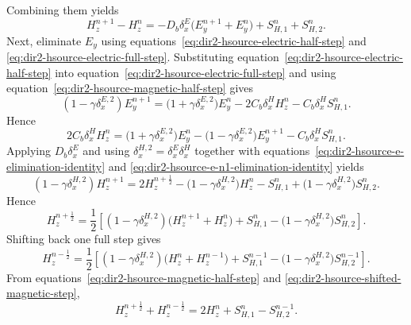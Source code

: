 \documentclass{article}
\numberwithin{figure}{section}
\begin{document}
Combining them yields
\begin{equation}
    H_z^{n+1}-H_z^n=-D_b\delta_x^E\bigl(E_y^{n+1}+E_y^n\bigr)+S_{H,1}^n+S_{H,2}^n. \label{eq:dir2-hsource-h-difference}
\end{equation}
Next, eliminate $E_y$ using equations~\eqref{eq:dir2-hsource-electric-half-step} and \eqref{eq:dir2-hsource-electric-full-step}. Substituting equation~\eqref{eq:dir2-hsource-electric-half-step} into equation~\eqref{eq:dir2-hsource-electric-full-step} and using equation~\eqref{eq:dir2-hsource-magnetic-half-step} gives
\begin{equation}
    \left(1-\gamma\delta_x^{E,2}\right)E_y^{n+1}=\bigl(1+\gamma\delta_x^{E,2}\bigr)E_y^n-2C_b\delta_x^H H_z^n-C_b\delta_x^H S_{H,1}^n. \label{eq:dir2-hsource-e-after-h-substitution}
\end{equation}
Hence
\begin{equation}
    2C_b\delta_x^H H_z^n=\bigl(1+\gamma\delta_x^{E,2}\bigr)E_y^n-\bigl(1-\gamma\delta_x^{E,2}\bigr)E_y^{n+1}-C_b\delta_x^H S_{H,1}^n. \label{eq:dir2-hsource-h-from-e}
\end{equation}
Applying $D_b\delta_x^E$ and using $\delta_x^{H,2}=\delta_x^E\delta_x^H$ together with equations~\eqref{eq:dir2-hsource-e-elimination-identity} and \eqref{eq:dir2-hsource-e-n1-elimination-identity} yields
\begin{equation}
    \left(1-\gamma\delta_x^{H,2}\right)H_z^{n+1}=2H_z^{n+\frac{1}{2}}-\bigl(1-\gamma\delta_x^{H,2}\bigr)H_z^n-S_{H,1}^n+\bigl(1-\gamma\delta_x^{H,2}\bigr)S_{H,2}^n. \label{eq:dir2-hsource-h-only-first-half}
\end{equation}
Hence
\begin{equation}
    H_z^{n+\frac{1}{2}}=\frac{1}{2}\left[\left(1-\gamma\delta_x^{H,2}\right)\bigl(H_z^{n+1}+H_z^n\bigr)+S_{H,1}^n-\bigl(1-\gamma\delta_x^{H,2}\bigr)S_{H,2}^n\right]. \label{eq:dir2-hsource-h-half-solved}
\end{equation}
Shifting back one full step gives
\begin{equation}
    H_z^{n-\frac{1}{2}}=\frac{1}{2}\left[\left(1-\gamma\delta_x^{H,2}\right)\bigl(H_z^n+H_z^{n-1}\bigr)+S_{H,1}^{n-1}-\bigl(1-\gamma\delta_x^{H,2}\bigr)S_{H,2}^{n-1}\right]. \label{eq:dir2-hsource-h-half-solved-shifted}
\end{equation}
From equations~\eqref{eq:dir2-hsource-magnetic-half-step} and \eqref{eq:dir2-hsource-shifted-magnetic-step},
\begin{equation}
    H_z^{n+\frac{1}{2}}+H_z^{n-\frac{1}{2}}=2H_z^n+S_{H,1}^n-S_{H,2}^{n-1}. \label{eq:dir2-hsource-h-only-centered}
\end{equation}
\end{document}
